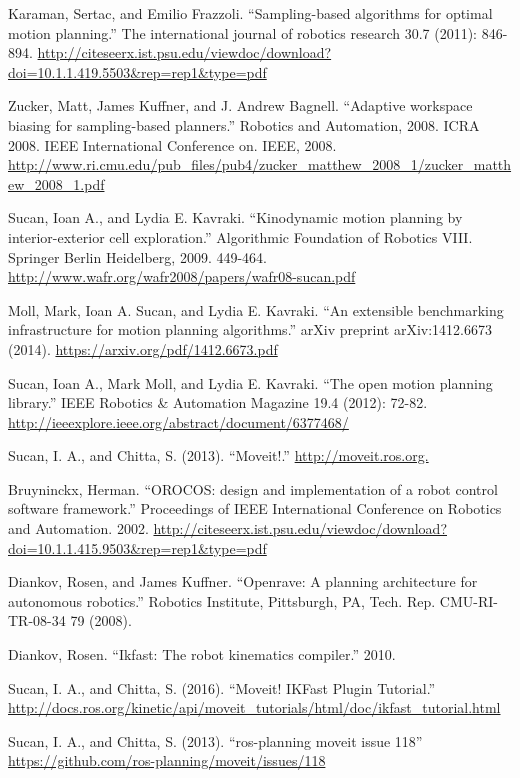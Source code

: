 \documentclass[12pt]{report}
\begin{document}
\begin{thebibliography}{99}
 Karaman, Sertac, and Emilio Frazzoli. ``Sampling-based algorithms for optimal motion planning.'' The international journal of robotics research 30.7 (2011): 846-894. \url{http://citeseerx.ist.psu.edu/viewdoc/download?doi=10.1.1.419.5503&rep=rep1&type=pdf}

 Zucker, Matt, James Kuffner, and J. Andrew Bagnell. ``Adaptive workspace biasing for sampling-based planners.'' Robotics and Automation, 2008. ICRA 2008. IEEE International Conference on. IEEE, 2008. \url{http://www.ri.cmu.edu/pub_files/pub4/zucker_matthew_2008_1/zucker_matthew_2008_1.pdf}

 Sucan, Ioan A., and Lydia E. Kavraki. ``Kinodynamic motion planning by interior-exterior cell exploration.'' Algorithmic Foundation of Robotics VIII. Springer Berlin Heidelberg, 2009. 449-464. \url{http://www.wafr.org/wafr2008/papers/wafr08-sucan.pdf}

 Moll, Mark, Ioan A. Sucan, and Lydia E. Kavraki. ``An extensible benchmarking infrastructure for motion planning algorithms.'' arXiv preprint arXiv:1412.6673 (2014). \url{https://arxiv.org/pdf/1412.6673.pdf}

 Sucan, Ioan A., Mark Moll, and Lydia E. Kavraki. ``The open motion planning library.'' IEEE Robotics \& Automation Magazine 19.4 (2012): 72-82. \url{http://ieeexplore.ieee.org/abstract/document/6377468/}

 Sucan, I. A., and Chitta, S. (2013). ``Moveit!.'' \url{http://moveit.ros.org.}

 Bruyninckx, Herman. ``OROCOS: design and implementation of a robot control software framework.'' Proceedings of IEEE International Conference on Robotics and Automation. 2002. \url{http://citeseerx.ist.psu.edu/viewdoc/download?doi=10.1.1.415.9503&rep=rep1&type=pdf}

 Diankov, Rosen, and James Kuffner. ``Openrave: A planning architecture for autonomous robotics.'' Robotics Institute, Pittsburgh, PA, Tech. Rep. CMU-RI-TR-08-34 79 (2008).

 Diankov, Rosen. ``Ikfast: The robot kinematics compiler.'' 2010.

 Sucan, I. A., and Chitta, S. (2016). ``Moveit! IKFast Plugin Tutorial.'' \url{http://docs.ros.org/kinetic/api/moveit_tutorials/html/doc/ikfast_tutorial.html}

 Sucan, I. A., and Chitta, S. (2013). ``ros-planning moveit issue 118'' \url{https://github.com/ros-planning/moveit/issues/118}


\end{thebibliography}
\end{document}
